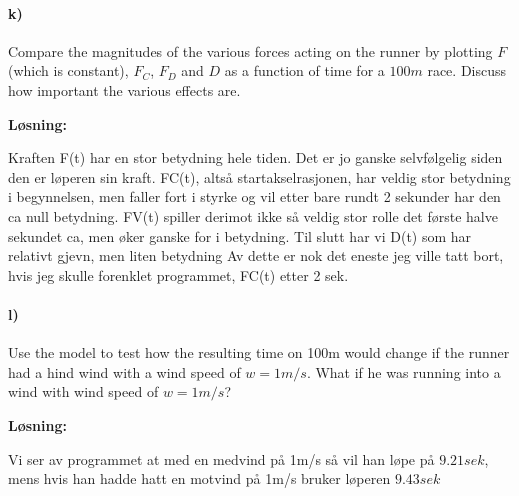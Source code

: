 \documentclass[11pt, A4paper,norsk]{article}
\begin{document}
		\paragraph{k)}
			\begin{flushleft}
Compare the magnitudes of the various forces acting on the runner by plotting $F$ (which is constant), $F_{C}$, $F_{D}$ and $D$ as a function of time for a $100m$ race. Discuss how important the various effects are.
			\end{flushleft}
			\begin{flushleft}
\textbf{Løsning:}
			\end{flushleft}
				\begin{flushleft}

Kraften F(t) har en stor betydning hele tiden. Det er jo ganske selvfølgelig siden den er løperen sin kraft. FC(t), altså startakselrasjonen, har veldig stor betydning i begynnelsen, men faller fort i styrke og vil etter bare rundt 2 sekunder har den ca null betydning.
FV(t) spiller derimot ikke så veldig stor rolle det første halve sekundet ca,
men øker ganske for i betydning.
Til slutt har vi D(t) som har relativt gjevn, men liten betydning
Av dette er nok det eneste jeg ville tatt bort, hvis jeg skulle forenklet programmet, FC(t) etter 2 sek.
				\end{flushleft}
		\paragraph{l)}
			\begin{flushleft}
Use the model to test how the resulting time on 100m would change if the runner had a hind wind with a wind speed of $w = 1m/s$. What if he was running into a wind with wind speed of $w = 1m/s$?
			\end{flushleft}
			\begin{flushleft}
\textbf{Løsning:}
			\end{flushleft}
				\begin{flushleft}

Vi ser av programmet at med en medvind på 1m/s så vil han løpe på $9.21sek$, mens hvis han hadde hatt en motvind på 1m/s bruker løperen $9.43sek$
				\end{flushleft}
\end{document}

